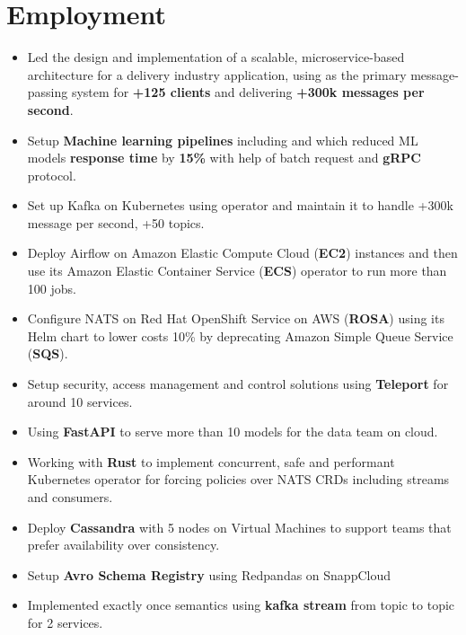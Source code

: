\section{Employment}

\begin{itemize}
      \item Led the design and implementation of a scalable, microservice-based architecture for a delivery industry application,
            using  as the primary message-passing system for \textbf{+125 clients} and delivering
            \textbf{+300k messages per second}.
      \item Setup \textbf{Machine learning pipelines} including  and
       which reduced ML models \textbf{response time} by \textbf{15\%}
            with help of batch request and \textbf{gRPC} protocol.
      \item Set up Kafka on Kubernetes using  operator and maintain it to handle +300k
      message per second, +50 topics.
      \item Deploy Airflow on Amazon Elastic Compute Cloud (\textbf{EC2}) instances and then use
            its Amazon Elastic Container Service (\textbf{ECS}) operator
            to run more than 100 jobs.
      \item Configure NATS on Red Hat OpenShift Service on AWS (\textbf{ROSA})
            using its Helm chart to lower costs 10\% by deprecating Amazon Simple Queue Service (\textbf{SQS}).
      \item Setup security, access management and control solutions using \textbf{Teleport} for around 10 services.
      \item Using \textbf{FastAPI} to serve more than 10 models for the data team on cloud.
      \item Working with \textbf{Rust} to implement concurrent, safe and performant Kubernetes operator for forcing
            policies over NATS CRDs including streams and consumers.
      \item Deploy \textbf{Cassandra} with 5 nodes on Virtual Machines to support teams that prefer availability over consistency.
      \item Setup \textbf{Avro Schema Registry} using Redpandas on SnappCloud
      \item Implemented exactly once semantics using \textbf{kafka stream} from topic to topic for 2 services.
\end{itemize}

